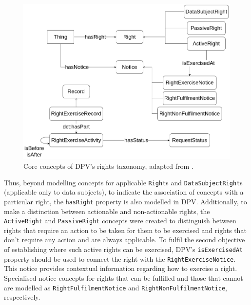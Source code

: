 \begin{figure}[ht]
    \centering
    \includegraphics[width=0.8\linewidth]{figures/chapter-4/DPV-rights.png}
    \caption{Core concepts of DPV's rights taxonomy, adapted from \cite{pandit_primer_2022}.}
    \label{fig:rights_dpv}
\end{figure}

Thus, beyond modelling concepts for applicable \texttt{Right}s and \texttt{DataSubjectRight}s (applicable only to data subjects), to indicate the association of concepts with a particular right, the \texttt{hasRight} property is also modelled in DPV.
Additionally, to make a distinction between actionable and non-actionable rights, the \texttt{ActiveRight} and \texttt{PassiveRight} concepts were created to distinguish between rights that require an action to be taken for them to be exercised and rights that don't require any action and are always applicable.%
To fulfil the second objective of establishing where such active rights can be exercised, DPV's \texttt{isExercisedAt} property should be used to connect the right with the \texttt{RightExerciseNotice}.
This notice provides contextual information regarding how to exercise a right.
Specialised notice concepts for rights that can be fulfilled and those that cannot are modelled as \texttt{RightFulfilmentNotice} and \texttt{RightNonFulfilmentNotice}, respectively.

